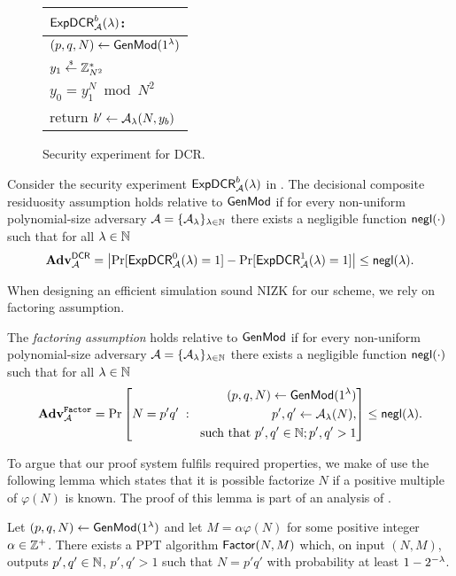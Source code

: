 \begin{figure}[h]
\begin{center}
\begin{tabular}{l}
$\mathsf{ExpDCR}_{\mathcal{A}}^{b}(\lambda)$: \\
\hline
$(p, q, N) \leftarrow \mathsf{GenMod}(1{^{\lambda}})$ \\
$y_1 \stackrel{{\scriptscriptstyle\$}}{\leftarrow} \mathbb{Z}_{N^2}^*$ \\
$y_0 = y_1^N \bmod N^2$\\
return	$b' \leftarrow \mathcal{A}_{\lambda}(N,y_b)$
\end{tabular}
\end{center}
\caption{\label{fig:dcr}Security experiment for DCR.}
\end{figure}

\begin{definition}
Consider the security experiment $\mathsf{ExpDCR}_{\mathcal{A}}^{b}(\lambda)$ in .
The decisional composite residuosity assumption holds relative to $\mathsf{GenMod}$ if for every non-uniform polynomial-size adversary $\mathcal{A} = \{\mathcal{A}_{\lambda}\}_{\lambda \in \mathbb{N}}$ there exists a negligible function $\mathsf{negl}(\cdot)$ such that for all $\lambda \in \mathbb{N}$ 
\[\mathbf{Adv}^\mathsf{DCR}_{\mathcal{A}} = \left| \Pr[\mathsf{ExpDCR}_{\mathcal{A}}^{0}(\lambda) = 1] - \Pr[\mathsf{ExpDCR}_{\mathcal{A}}^{1}(\lambda) = 1] \right| \leq \mathsf{negl}(\lambda).\]
\end{definition} 


When designing an efficient simulation sound NIZK for our scheme, we rely on factoring assumption. 

\begin{definition}
The \emph{factoring assumption} holds relative to $\mathsf{GenMod}$ if  for every non-uniform polynomial-size adversary $\mathcal{A} = \{\mathcal{A}_{\lambda}\}_{\lambda \in \mathbb{N}}$ there exists a negligible function $\mathsf{negl}(\cdot)$ such that for all $\lambda \in \mathbb{N}$ 
\[ \mathbf{Adv}_{\mathcal{A}}^{\mathtt{Factor}} = 
\Pr\left[ 
		N = p'q'
		\;:\;
    \begin{aligned}
    	(p, q, N) \leftarrow \mathsf{GenMod}(1{^{\lambda}}) \\
			p',q' \leftarrow \mathcal{A}_{\lambda}(N), \\
			\text{ such that }  p', q' \in \mathbb{N}; p', q'>1
    \end{aligned}
    \right] 
\leq \mathsf{negl}(\lambda). 
\]
\end{definition}

To argue that our proof system fulfils required properties, we make of use the following lemma which states that it is possible factorize $N$ if a positive multiple of $\varphi(N)$ is known. The proof of this lemma is part of an analysis of \cite[Theorem 8.50]{books/crc/KatzLindell2014}.
\begin{lemma}\label{factor-lemma}
Let $(p,q,N)  \leftarrow \mathsf{GenMod}(1{^{\lambda}})$ and let $M = \alpha\varphi(N)$ for some positive integer $\alpha\in \mathbb{Z}^+$. There exists a PPT algorithm $\mathsf{Factor}(N, M)$ which, on input $(N,M)$, outputs $p',q' \in \mathbb{N}$, $p', q'>1$ such that $N = p'q'$ with probability at least $1-2^{-\lambda}$. 
\end{lemma}


